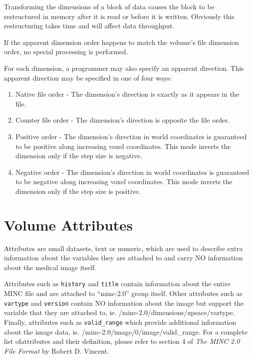 \documentclass{article}
\begin{document}
Transforming the dimensions of a block of data causes the block to be
restructured in memory after it is read or before it is written.  Obviously
this restructuring takes time and will affect data throughput.

If the apparent dimension order happens to match the volume's file
dimension order, no special processing is performed.

For each dimension, a programmer may also specify an apparent
direction.  This apparent direction may be specified in one of four
ways:
\begin{enumerate}
\item Native file order - The dimension's direction is exactly as it
appears in the file.
\item Counter file order - The dimension's direction is opposite the
file order.
\item Positive order - The dimension's direction in world coordinates
is guaranteed to be positive along increasing voxel coordinates.  This
mode inverts the dimension only if the step size is negative.
\item Negative order - The dimension's direction in world coordinates
is guaranteed to be negative along increasing voxel coordinates.  This
mode inverts the dimension only if the step size is positive.
\end{enumerate}
\section{Volume Attributes}
Attributes are small datasets, text or numeric, which are used to describe extra information about 
the variables they are attached to and carry NO information about the medical image itself.

Attributes such as {\tt history} and {\tt title} contain information about the entire MINC file and are attached to ``minc-2.0'' group itself. Other attributes such as {\tt vartype} and {\tt version} contain NO information about the image 
but support the variable that they are attached to, ie. /minc-2.0/dimensions/xpsace/vartype. Finally, attributes such as {\tt valid\_range} which provide additional information about the image data, ie. /minc-2.0/image/0/image/valid\_range. For a complete list ofattributes and their definition, please refer to section 4 of \emph{The MINC 2.0 File Format} by Robert D. Vincent.
 
\end{document}
